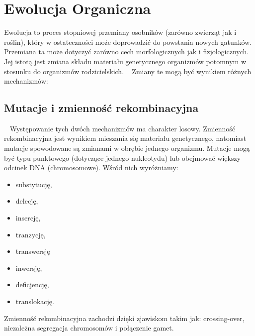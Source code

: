 \documentclass[twoside,a4paper,10]{book}
\begin{document}
  \section{Ewolucja Organiczna}
    Ewolucja to  proces stopniowej przemiany osobników (zarówno zwierząt jak i roślin), który w ostateczności może doprowadzić do powstania nowych gatunków. Przemiana ta może dotyczyć zarówno cech morfologicznych jak i fizjologicznych. Jej istotą jest zmiana składu materiału genetycznego organizmów potomnym w stosunku do organizmów rodzicielskich. ~\cite{encyk}  
Zmiany te mogą być wynikiem różnych mechanizmów:
             \subsection{  Mutacje i zmienność rekombinacyjna }~\label{sec:mutate}
Występowanie tych dwóch mechanizmów ma charakter losowy. Zmienność rekombinacyjna jest wynikiem mieszania się materiału genetycznego, natomiast mutacje spowodowane są zmianami w obrębie jednego organizmu.
    Mutacje mogą być typu punktowego (dotyczące  jednego nukleotydu) lub obejmować większy odcinek DNA (chromosomowe). Wśród nich wyróżniamy:
\begin{itemize}
\item{substytucję, }
\item{delecję,}
\item{insercję,}
\item{tranzycję,}
\item{transwersję}
\item{inwersję, }
\item{deficjencję,}
\item{translokację. ~\cite{berkely}}
\end{itemize}

    Zmienność rekombinacyjna zachodzi dzięki zjawiskom takim jak: crossing-over, niezależna segregacja chromosomów i połączenie gamet.
\end{document}
